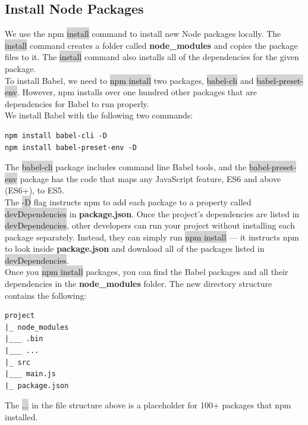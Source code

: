 \documentclass[11pt]{article}
\begin{document}
\subsection{Install Node Packages}
We use the npm \colorbox{lightgray}{install} command to install new Node packages locally. The \colorbox{lightgray}{install} command creates a folder called \textbf{node\_modules} and copies the package files to it. The \colorbox{lightgray}{install} command also installs all of the dependencies for the given package. \\
\newline
To install Babel, we need to \colorbox{lightgray}{npm install} two packages, \colorbox{lightgray}{babel-cli} and \colorbox{lightgray}{babel-preset-env}. However, npm installs over one hundred other packages that are dependencies for Babel to run properly. \\
\newline
We install Babel with the following two commands:
\begin{lstlisting}[basicstyle=\small\ttfamily\color{theWhite}, backgroundcolor = \color{theBlack}, language = Comment]
npm install babel-cli -D
npm install babel-preset-env -D
\end{lstlisting}

The \colorbox{lightgray}{babel-cli} package includes command line Babel tools, and the \colorbox{lightgray}{babel-preset-env} package has the code that maps any JavaScript feature, ES6 and above (ES6+), to ES5. \\
\newline
The \colorbox{lightgray}{-D} flag instructs npm to add each package to a property called \colorbox{lightgray}{devDependencies} in \textbf{package.json}. Once the project’s dependencies are listed in \colorbox{lightgray}{devDependencies}, other developers can run your project without installing each package separately. Instead, they can simply run \colorbox{lightgray}{npm install} — it instructs npm to look inside \textbf{package.json} and download all of the packages listed in \colorbox{lightgray}{devDependencies}. \\
\newline
Once you \colorbox{lightgray}{npm install} packages, you can find the Babel packages and all their dependencies in the \textbf{node\_modules} folder. The new directory structure contains the following:
\begin{lstlisting}[basicstyle=\small\ttfamily\color{theWhite}, backgroundcolor = \color{theBlack}, language = Comment]
project
|_ node_modules
|___ .bin
|___ ...
|_ src 
|___ main.js
|_ package.json
\end{lstlisting}
The \colorbox{lightgray}{...} in the file structure above is a placeholder for 100+ packages that npm installed.
\end{document}
